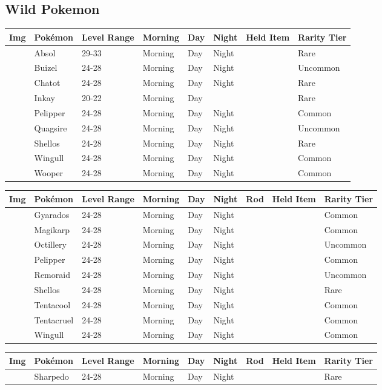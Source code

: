 \subsection{Wild Pokemon}%
\label{subsec:WildPokemon}%
\begin{longtable}{||l l l l l l l l||}%
\hline%
Img&Pokémon&Level Range&Morning&Day&Night&Held Item&Rarity Tier\\%
\hline%
\endhead%
\hline%
&Absol&29{-}33&Morning&Day&Night&&Rare\\%
\hline%
&Buizel&24{-}28&Morning&Day&Night&&Uncommon\\%
\hline%
&Chatot&24{-}28&Morning&Day&Night&&Rare\\%
\hline%
&Inkay&20{-}22&Morning&Day&&&Rare\\%
\hline%
&Pelipper&24{-}28&Morning&Day&Night&&Common\\%
\hline%
&Quagsire&24{-}28&Morning&Day&Night&&Uncommon\\%
\hline%
&Shellos&24{-}28&Morning&Day&Night&&Rare\\%
\hline%
&Wingull&24{-}28&Morning&Day&Night&&Common\\%
\hline%
&Wooper&24{-}28&Morning&Day&Night&&Common\\%
\hline%
\end{longtable}%
\begin{longtable}{||l l l l l l l l l||}%
\hline%
Img&Pokémon&Level Range&Morning&Day&Night&Rod&Held Item&Rarity Tier\\%
\hline%
\endhead%
\hline%
&Gyarados&24{-}28&Morning&Day&Night&&&Common\\%
\hline%
&Magikarp&24{-}28&Morning&Day&Night&&&Common\\%
\hline%
&Octillery&24{-}28&Morning&Day&Night&&&Uncommon\\%
\hline%
&Pelipper&24{-}28&Morning&Day&Night&&&Common\\%
\hline%
&Remoraid&24{-}28&Morning&Day&Night&&&Uncommon\\%
\hline%
&Shellos&24{-}28&Morning&Day&Night&&&Rare\\%
\hline%
&Tentacool&24{-}28&Morning&Day&Night&&&Common\\%
\hline%
&Tentacruel&24{-}28&Morning&Day&Night&&&Common\\%
\hline%
&Wingull&24{-}28&Morning&Day&Night&&&Common\\%
\hline%
\end{longtable}%
\begin{longtable}{||l l l l l l l l l||}%
\hline%
Img&Pokémon&Level Range&Morning&Day&Night&Rod&Held Item&Rarity Tier\\%
\hline%
\endhead%
\hline%
&Sharpedo&24{-}28&Morning&Day&Night&&&Rare\\%
\hline%
\end{longtable}